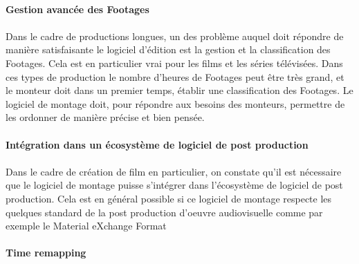 \paragraph{Gestion avancée des Footages}

\paragraph{}

Dans le cadre de productions longues, un des problème auquel doit répondre de
manière satisfaisante le logiciel d'édition est la gestion et la classification
des Footages. Cela est en particulier vrai pour les films et les séries télévisées.
Dans ces types de production le nombre d'heures de Footages peut être très grand, et
le monteur doit dans un premier temps, établir une classification
des Footages. Le logiciel de montage doit, pour répondre aux besoins des monteurs,
permettre de les ordonner de manière précise et bien pensée.

\paragraph{Intégration dans un écosystème de logiciel de post production}

\paragraph{}

Dans le cadre de création de film en particulier, on constate qu'il est nécessaire
que le logiciel de montage puisse s'intégrer dans l'écosystème de logiciel de post
production. Cela est en général possible si ce logiciel de montage respecte les
quelques standard de la post production d'oeuvre audiovisuelle comme par exemple le
Material eXchange Format 

\paragraph{Time remapping}

\paragraph{ }

